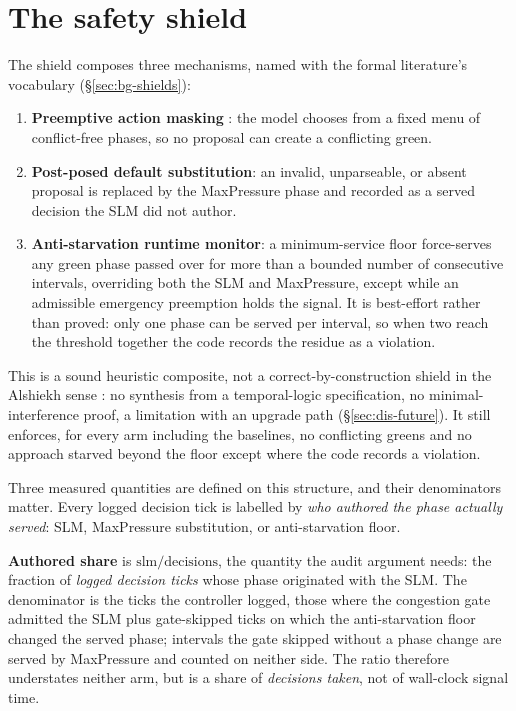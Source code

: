 \section{The safety shield}\label{sec:des-shield}
The shield composes three mechanisms, named with the formal literature's
vocabulary (\S\ref{sec:bg-shields}):

\begin{enumerate}
\item \textbf{Preemptive action masking} \cite{huang2020masking}: the model
chooses from a fixed menu of conflict-free phases, so no proposal can
create a conflicting green.
\item \textbf{Post-posed default substitution}: an invalid, unparseable, or
absent proposal is replaced by the MaxPressure phase and recorded as a
served decision the SLM did not author.
\item \textbf{Anti-starvation runtime monitor}: a minimum-service floor
force-serves any green phase passed over for more than a bounded number
of consecutive intervals, overriding both the SLM and MaxPressure, except
while an admissible emergency preemption holds the signal. It is
best-effort rather than proved: only one phase can be served per
interval, so when two reach the threshold together the code records the
residue as a violation.
\end{enumerate}

This is a sound heuristic composite, not a correct-by-construction shield
in the Alshiekh sense \cite{alshiekh2018shield}: no synthesis from a
temporal-logic specification, no minimal-interference proof, a limitation
with an upgrade path
(\S\ref{sec:dis-future}). It still enforces, for every arm
including the baselines, no conflicting greens and no approach starved
beyond the floor except where the code records a violation.

Three measured quantities are defined on this structure, and their
denominators matter. Every
logged decision tick is labelled by \emph{who authored the phase actually
served}: SLM, MaxPressure substitution, or anti-starvation floor.

\textbf{Authored share} is $\text{slm}/\text{decisions}$, the quantity the
audit argument needs: the fraction of \emph{logged decision ticks} whose
phase originated with the SLM. The denominator is the ticks the
controller logged, those where the congestion gate admitted the SLM
plus gate-skipped ticks on which the anti-starvation floor changed the
served phase; intervals the gate skipped without a phase change are served
by MaxPressure and counted on neither side. The ratio therefore understates
neither arm, but is a share of \emph{decisions taken}, not of wall-clock
signal time.

